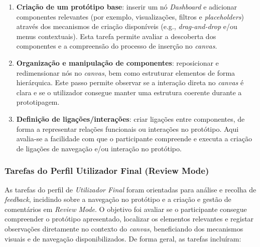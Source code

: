 \begin{enumerate}
    \item \textbf{Criação de um protótipo base}: inserir um nó \textit{Dashboard} e adicionar componentes relevantes (por exemplo, visualizações, filtros e \textit{placeholders}) através dos mecanismos de criação disponíveis (e.g., \textit{drag-and-drop} e/ou menus contextuais). Esta tarefa permite avaliar a descoberta dos componentes e a compreensão do processo de inserção no \textit{canvas}.
    \item \textbf{Organização e manipulação de componentes}: reposicionar e redimensionar nós no \textit{canvas}, bem como estruturar elementos de forma hierárquica. Este passo permite observar se a interação direta no \textit{canvas} é clara e se o utilizador consegue manter uma estrutura coerente durante a prototipagem.
    \item \textbf{Definição de ligações/interações}: criar ligações entre componentes, de forma a representar relações funcionais ou interações no protótipo. Aqui avalia-se a facilidade com que o participante compreende e executa a criação de ligações de navegação e/ou interação no protótipo.
\end{enumerate}

\subsubsection{Tarefas do Perfil Utilizador Final (Review Mode)}
\label{subsubsec:cap5_tasks_enduser}

As tarefas do perfil de \textit{Utilizador Final} foram orientadas para análise e recolha de \textit{feedback}, incidindo sobre a navegação no protótipo e a criação e gestão de comentários em \textit{Review Mode}. O objetivo foi avaliar se o participante consegue compreender o protótipo apresentado, localizar os elementos relevantes e registar observações diretamente no contexto do \textit{canvas}, beneficiando dos mecanismos visuais e de navegação disponibilizados. De forma geral, as tarefas incluíram:

